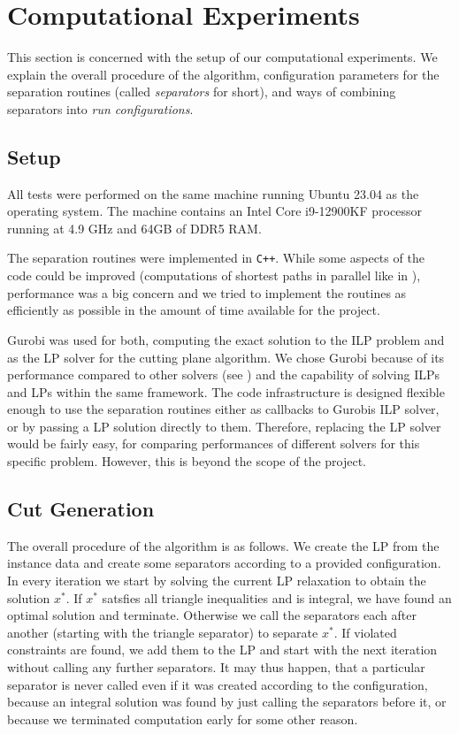 \section{Computational Experiments}\label{sec:experiments}
This section is concerned with the setup of our computational experiments.
We explain the overall procedure of the algorithm, configuration parameters for the separation routines (called \textit{separators} for short), and ways of combining separators into \textit{run configurations}.

\subsection{Setup}\label{subsec:experiments_setup}
All tests were performed on the same machine running Ubuntu 23.04 as the operating system.
The machine contains an Intel Core i9-12900KF processor running at 4.9 GHz and 64GB of DDR5 RAM. 

The separation routines were implemented in \texttt{C++}.
While some aspects of the code could be improved (\eg computations of shortest paths in parallel like in \cite{sorensenSeparationHeuristic2Partition2020}),
performance was a big concern and we tried to implement the routines as efficiently as possible in the amount of time available for the project.

Gurobi \cite{gurobioptimizationllcGurobiOptimizerReference2023} was used for both, computing the exact solution to the ILP problem and as the LP solver for the cutting plane algorithm.
We chose Gurobi because of its performance compared to other solvers (see \cite{meindlAnalysisCommercialFree2012}) and the capability of solving ILPs and LPs within the same framework.
The code infrastructure is designed flexible enough to use the separation routines either as callbacks to Gurobis ILP solver, or by passing a LP solution directly to them.
Therefore, replacing the LP solver would be fairly easy, \eg for comparing performances of different solvers for this specific problem.
However, this is beyond the scope of the project.

\subsection{Cut Generation}\label{subsec:cut_generation}
The overall procedure of the algorithm is as follows.
We create the LP from the instance data and create some separators according to a provided configuration.
In every iteration we start by solving the current LP relaxation to obtain the solution $x^{*}$.
If $x^{*}$ satsfies all triangle inequalities and is integral, we have found an optimal solution and terminate.
Otherwise we call the separators each after another (starting with the triangle separator) to separate $x^{*}$.
If violated constraints are found, we add them to the LP and start with the next iteration without calling any further separators.
It may thus happen, that a particular separator is never called even if it was created according to the configuration,
\eg because an integral solution was found by just calling the separators before it, or because we terminated computation early for some other reason.

